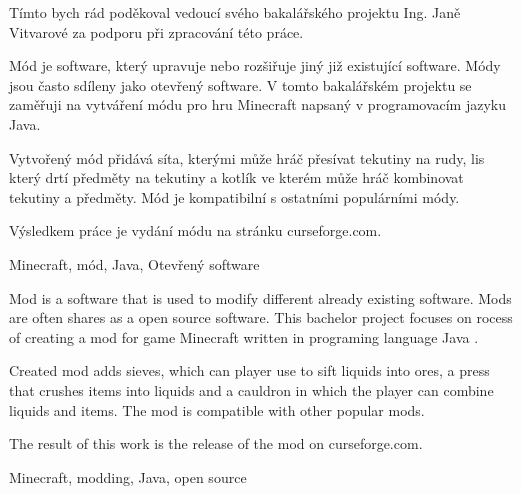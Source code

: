 \documentclass[FM,Proj,bw]{tulthesis}
\begin{document}

\begin{acknowledgement}
		Tímto bych rád poděkoval vedoucí svého bakalářského projektu Ing. Janě Vitvarové za podporu při zpracování této práce.
\end{acknowledgement}

	\begin{abstractCZ}
		Mód je software, který upravuje nebo rozšiřuje jiný již existující software. Módy jsou často sdíleny jako otevřený software. V tomto bakalářském projektu se zaměřuji na vytváření módu pro hru Minecraft napsaný v programovacím jazyku Java.
  
    Vytvořený mód přidává síta, kterými může hráč přesívat tekutiny na rudy, lis který drtí předměty na tekutiny a kotlík ve kterém může hráč kombinovat tekutiny a předměty. Mód je kompatibilní s ostatními populárními módy.

    Výsledkem práce je vydání módu na stránku curseforge.com. 
	\end{abstractCZ}
	
	\begin{keywordsCZ}
		Minecraft, mód, Java, Otevřený software
	\end{keywordsCZ}
	\vspace{2cm}
	
	\begin{abstractEN}
		Mod is a software that is used to modify different already existing software. Mods are often shares as a open source software. This bachelor project focuses on rocess of creating a mod for game Minecraft written in programing language Java .

        Created mod adds sieves, which can player use to sift liquids into ores, a press that crushes items into liquids and a cauldron in which the player can combine liquids and items. The mod is compatible with other popular mods.

        The result of this work is the release of the mod on curseforge.com.
	\end{abstractEN}
	
	\begin{keywordsEN}
		Minecraft, modding, Java, open source
	\end{keywordsEN}
	
	\tableofcontents
	
	\listoffigures
        \listoftables
\end{document}
